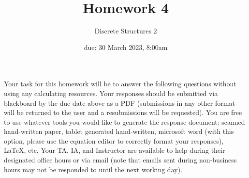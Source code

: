 \documentclass[11pt, oneside]{article}   	%
\title{Homework 4}
\author{Discrete Structures 2}
\date{due: 30 March 2023, 8:00am}							%
\begin{document}
\maketitle

Your task for this homework will be to answer the following questions without using any calculating resources. 
Your responses should be submitted via blackboard by the due date above as a PDF (submissions in any other format will be returned to the user and a resubmissions will be requested). 
You are free to use whatever tools you would like to generate the response document: 
scanned hand-written paper, 
tablet generated hand-written, 
microsoft word (with this option, please use the equation editor to correctly format your responses), 
\LaTeX, etc.
Your TA, IA, and Instructor are available to help during their designated office hours or via email 
(note that emails sent during non-business hours may not be responded to until the next working day). 
\end{document}
